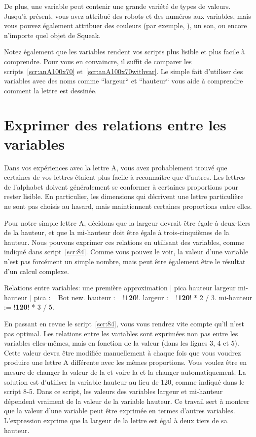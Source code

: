\documentclass[a4paper,10pt,twoside]{book}
\begin{document}
De plus, une variable peut contenir une grande vari\'et\'e de types de valeurs. Jusqu'\`a pr\'esent, vous avez attribu\'e des robots et des num\'eros aux variables, mais vous pouvez \'egalement attribuer des couleurs (par exemple, ), un son, ou encore n'importe quel objet de Squeak. 

Notez \'egalement que les variables rendent vos scripts plus lisible et plus facile \`a comprendre. Pour vous en convaincre, il suffit de comparer les scripts~\ref{scr:anA100x70} et~\ref{scr:anA100x70withvar}. Le simple fait d'utiliser des variables avec des noms comme ``largeur`` et ``hauteur`` vous aide \`a comprendre comment la lettre est dessin\'ee. 

\section{Exprimer des relations entre les variables } 

Dans vos exp\'eriences avec la lettre A, vous avez probablement trouv\'e que certaines de vos lettres \'etaient plus facile \`a reconna\^itre que d'autres. Les lettres de l'alphabet doivent g\'en\'eralement se conformer \`a certaines proportions pour rester lisible. En particulier, les dimensions qui d\'ecrivent une lettre particuli\`ere ne sont pas choisis au hasard, mais maintiennent certaines proportions entre elles. 

Pour notre simple lettre A, d\'ecidons que la largeur devrait \^etre \'egale \`a deux-tiers de la hauteur, et que la mi-hauteur doit \^etre \'egale \`a trois-cinqui\`emes de la hauteur. Nous pouvons exprimer ces relations en utilisant des variables, comme indiqu\'e dans script~\ref{scr:84}. Comme vous pouvez le voir, la valeur d'une variable n'est pas forc\'ement un simple nombre, mais peut \^etre \'egalement \^etre le r\'esultat d'un calcul complexe. 


\begin{script}[84]{Relations entre variables: une premi\`ere approximation}
| pica hauteur largeur mi-hauteur | 
pica := Bot new. 
hauteur := !\textbf{120}!. 
largeur := !\textbf{120}! * 2 / 3. 
mi-hauteur := !\textbf{120}! * 3 / 5. 
\end{script}

En passant en revue le script~\ref{scr:84}, vous vous rendrez vite compte qu'il n'est pas optimal. Les relations entre les variables sont exprim\'ees non pas entre les variables elles-m\^emes, mais en fonction de la valeur  (dans les lignes 3, 4 et 5). Cette valeur devra \^etre modifi\'ee manuellement \`a chaque fois que vous voudrez produire une lettre A diff\'erente avec les m\^emes proportions. Vous voulez \^etre en mesure de changer la valeur de la  et voire la  et la  changer automatiquement. La solution est d'utiliser la variable hauteur  au lieu de 120, comme indiqu\'e dans le script 8-5. Dans ce script, les valeurs des variables largeur et mi-hauteur d\'ependent vraiment de la valeur de la variable hauteur. Ce travail sert \`a montrer que la valeur d'une variable peut \^etre exprim\'ee en termes d'autres variables. L'expression  exprime que la largeur de la lettre est \'egal \`a deux tiers de sa hauteur. 
\end{document}
